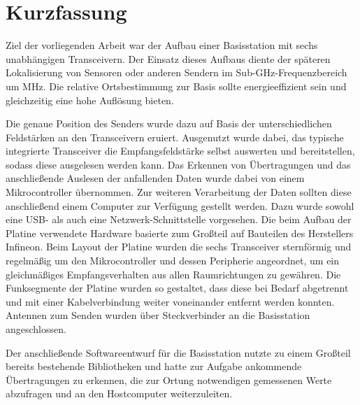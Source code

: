 
\chapter*{Kurzfassung}
\label{sec:kurzfassung}
\pagestyle{scrheadings}

Ziel der vorliegenden Arbeit war der Aufbau einer Basisstation mit sechs unabhängigen Transceivern. Der Einsatz dieses Aufbaus diente der späteren Lokalisierung von Sensoren oder anderen Sendern im Sub-GHz-Frequenzbereich um \unit[868]{MHz}. Die relative Ortsbestimmung zur Basis sollte energieeffizient sein und gleichzeitig eine hohe Auflösung bieten. 

Die genaue Position des Senders wurde dazu auf Basis der unterschiedlichen Feldstärken an den Transceivern eruiert. Ausgenutzt wurde dabei, das typische integrierte Transceiver die Empfangsfeldstärke selbst auswerten und bereitstellen, sodass diese ausgelesen werden kann. Das Erkennen von Übertragungen und das anschließende Auslesen der anfallenden Daten wurde dabei von einem Mikrocontroller übernommen. Zur weiteren Verarbeitung der Daten sollten diese anschließend einem Computer zur Verfügung gestellt werden. Dazu wurde sowohl eine USB- als auch eine Netzwerk-Schnittstelle vorgesehen. Die beim Aufbau der Platine verwendete Hardware basierte zum Großteil auf Bauteilen des Herstellers Infineon. 
Beim Layout der Platine wurden die sechs Transceiver sternförmig und regelmäßig um den Mikrocontroller und dessen Peripherie angeordnet, um ein gleichmäßiges Empfangsverhalten aus allen Raumrichtungen zu gewähren. Die Funksegmente der Platine wurden so gestaltet, dass diese bei Bedarf abgetrennt und mit einer Kabelverbindung weiter voneinander entfernt werden konnten. Antennen zum Senden wurden über Steckverbinder an die Basisstation angeschlossen.

Der anschließende Softwareentwurf für die Basisstation nutzte zu einem Großteil bereits bestehende Bibliotheken und hatte zur Aufgabe ankommende Übertragungen zu erkennen, die zur Ortung notwendigen gemessenen Werte abzufragen und an den Hostcomputer weiterzuleiten. 

